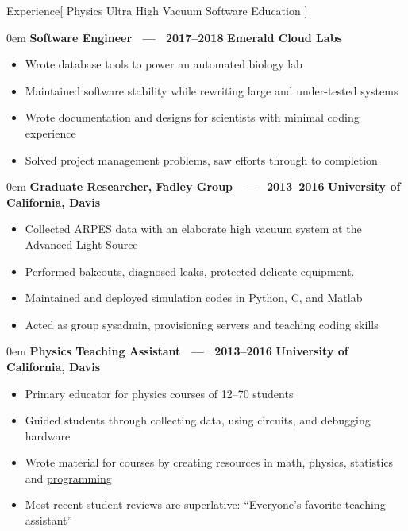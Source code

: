 \documentclass[11pt,a4paper]{article}
\newenvironment{headedsection}[2]{
    \begin{addmargin}[0.5em]{0em}
    {\large\bfseries #1} \hfill {\bfseries #2}%
    \begin{itemize}
        [label={}, topsep=0pt, itemsep=1.5pt, parsep=0pt, leftmargin=1.5em]
}{
    \end{itemize}
    \end{addmargin}
    \medskip
}
\begin{document}
\sloppy  %


\vspace{1em}

\begin{mysection}{Experience}[
Physics
\textbullet{} Ultra High Vacuum
\textbullet{} Software
\textbullet{} Education
]

    \begin{headedsection}
        {Software Engineer \ --- \ 2017--2018}{Emerald Cloud Labs}

        \item Wrote database tools to power an automated biology lab
        \item Maintained software stability while rewriting large and
            under-tested systems
        \item Wrote documentation and designs for scientists with minimal coding experience
        \item Solved project management problems, saw efforts through to
            completion
    \end{headedsection}

    \begin{headedsection}
          {Graduate Researcher, \href{http://www.physics.ucdavis.edu/fadleygroup/}{Fadley Group}
             \ --- \ 2013--2016}
          {University of California, Davis}

        \item Collected ARPES data with an elaborate high vacuum system at the Advanced Light Source
        \item Performed bakeouts, diagnosed leaks, protected delicate equipment.
        \item Maintained and deployed simulation codes in Python, C, and Matlab
        \item Acted as group sysadmin, provisioning servers and teaching coding
             skills
    \end{headedsection}

    \begin{headedsection}
          {Physics Teaching Assistant  \ --- \ 2013--2016}
          {University of California, Davis}

        \item Primary educator for physics courses of 12--70 students
        \item Guided students through collecting data, using circuits, and debugging hardware
        \item Wrote material for courses by creating resources in math, physics,
            statistics and
            \href{https://github.com/jgarst/AdvancedLab/releases/download/spring_2016/Python-FirstSteps.pdf}
                {programming}
        \item Most recent student reviews are superlative:
            ``Everyone's favorite teaching assistant''
    \end{headedsection}


\end{mysection}
\end{document}
